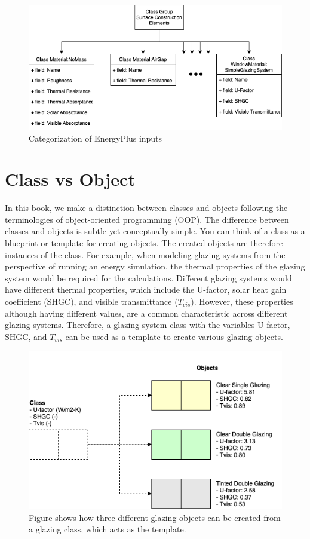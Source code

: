 \documentclass[
]{book}
\begin{document}
\begin{figure}

{\centering \includegraphics[width=0.8\linewidth]{figures/input_structure} 

}

\caption{Categorization of EnergyPlus inputs}\label{fig:input-structure}
\end{figure}

\hypertarget{class-vs-object}{%
\section{Class vs Object}\label{class-vs-object}}

In this book, we make a distinction between classes and objects following the terminologies of object-oriented programming (OOP). The difference between classes and objects is subtle yet conceptually simple. You can think of a class as a blueprint or template for creating objects. The created objects are therefore instances of the class. For example, when modeling glazing systems from the perspective of running an energy simulation, the thermal properties of the glazing system would be required for the calculations. Different glazing systems would have different thermal properties, which include the U-factor, solar heat gain coefficient (SHGC), and visible transmittance (\(T_{vis}\)). However, these properties although having different values, are a common characteristic across different glazing systems. Therefore, a glazing system class with the variables U-factor, SHGC, and \(T_{vis}\) can be used as a template to create various glazing objects.

\begin{figure}

{\centering \includegraphics[width=0.8\linewidth]{figures/class_object} 

}

\caption{Figure shows how three different glazing objects can be created from a glazing class, which acts as the template.}\label{fig:class-object}
\end{figure}
\end{document}
